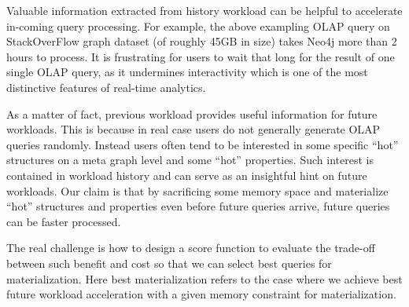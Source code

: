 Valuable information extracted from history workload can be helpful to accelerate in-coming query processing. For example, the above exampling OLAP query on StackOverFlow graph dataset (of roughly 45GB in size) takes Neo4j more than 2 hours to process. It is frustrating for users to wait that long for the result of one single OLAP query, as it undermines interactivity which is one of the most distinctive features of real-time analytics. %

As a matter of fact, previous workload provides useful information for future workloads. This is because in real case users do not generally generate OLAP queries randomly. Instead users often tend to be interested in some specific ``hot'' structures on a meta graph level and some ``hot'' properties. Such interest is contained in workload history and can serve as an insightful hint on future workloads. Our claim is that by sacrificing some memory space and materialize ``hot'' structures and properties even before future queries arrive, future queries can be faster processed.



The real challenge is how to design a score function to evaluate the trade-off  between such benefit and cost so that we can select best queries for materialization. Here best materialization refers to the case where we achieve best future workload acceleration with a given memory constraint for materialization.





